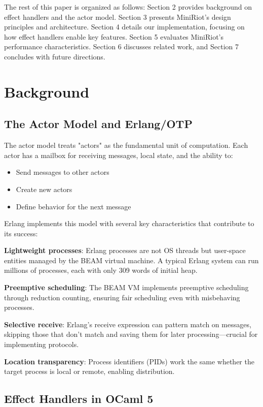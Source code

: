 \documentclass[sigplan,screen]{acmart}
\begin{document}
The rest of this paper is organized as follows: Section 2 provides background on effect handlers and the actor model. Section 3 presents MiniRiot's design principles and architecture. Section 4 details our implementation, focusing on how effect handlers enable key features. Section 5 evaluates MiniRiot's performance characteristics. Section 6 discusses related work, and Section 7 concludes with future directions.

\section{Background}

\subsection{The Actor Model and Erlang/OTP}

The actor model treats "actors" as the fundamental unit of computation. Each actor has a mailbox for receiving messages, local state, and the ability to:
\begin{itemize}
\item Send messages to other actors
\item Create new actors  
\item Define behavior for the next message
\end{itemize}

Erlang implements this model with several key characteristics that contribute to its success:

\textbf{Lightweight processes}: Erlang processes are not OS threads but user-space entities managed by the BEAM virtual machine. A typical Erlang system can run millions of processes, each with only 309 words of initial heap.

\textbf{Preemptive scheduling}: The BEAM VM implements preemptive scheduling through reduction counting, ensuring fair scheduling even with misbehaving processes.

\textbf{Selective receive}: Erlang's receive expression can pattern match on messages, skipping those that don't match and saving them for later processing—crucial for implementing protocols.

\textbf{Location transparency}: Process identifiers (PIDs) work the same whether the target process is local or remote, enabling distribution.

\subsection{Effect Handlers in OCaml 5}
\end{document}
